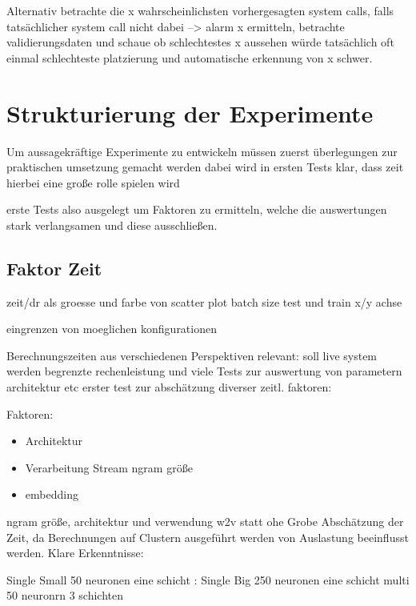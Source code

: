         Alternativ betrachte die x wahrscheinlichsten vorhergesagten system calls, falls tatsächlicher system call nicht dabei --> alarm
        x ermitteln, betrachte validierungsdaten und schaue ob schlechtestes x aussehen würde
        tatsächlich oft einmal schlechteste platzierung und automatische erkennung von x schwer.

\section{Strukturierung der Experimente}
    Um aussagekräftige Experimente zu entwickeln müssen zuerst 
    überlegungen zur praktischen umsetzung gemacht werden
    dabei wird in ersten Tests klar, dass zeit hierbei eine große rolle spielen wird

    erste Tests also ausgelegt um Faktoren zu ermitteln, welche die auswertungen stark verlangsamen
    und diese ausschließen.

    \subsection{Faktor Zeit}

        zeit/dr als groesse und farbe von scatter plot
        batch size test und train x/y achse

        eingrenzen von moeglichen konfigurationen

        Berechnungszeiten aus verschiedenen Perspektiven relevant:
        soll live system werden
        begrenzte rechenleistung und viele Tests zur auswertung von parametern architektur etc
        erster test zur abschätzung diverser zeitl. faktoren:

        Faktoren:
        \begin{itemize}
            \item Architektur
            \item Verarbeitung Stream
                \subitem ngram größe
            \item embedding
        \end{itemize}

        ngram größe, architektur und verwendung w2v statt ohe
        Grobe Abschätzung der Zeit, da Berechnungen auf Clustern ausgeführt werden von Auslastung beeinflusst werden.
        Klare Erkenntnisse:

            Single Small 50 neuronen eine schicht :
            Single Big 250 neuronen eine schicht
            multi 50 neuronrn 3 schichten

